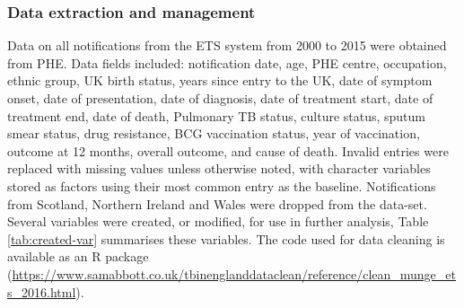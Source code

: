 \documentclass[11pt,twoside]{bristolthesis}
\begin{document}
  \hypertarget{data-extraction-and-management}{%
  \subsubsection{Data extraction and management}\label{data-extraction-and-management}}
  
  Data on all notifications from the ETS system from 2000 to 2015 were obtained from PHE. Data fields included: notification date, age, PHE centre, occupation, ethnic group, UK birth status, years since entry to the UK, date of symptom onset, date of presentation, date of diagnosis, date of treatment start, date of treatment end, date of death, Pulmonary TB status, culture status, sputum smear status, drug resistance, BCG vaccination status, year of vaccination, outcome at 12 months, overall outcome, and cause of death. Invalid entries were replaced with missing values unless otherwise noted, with character variables stored as factors using their most common entry as the baseline. Notifications from Scotland, Northern Ireland and Wales were dropped from the data-set. Several variables were created, or modified, for use in further analysis, Table \ref{tab:created-var} summarises these variables. The code used for data cleaning is available as an R package (\url{https://www.samabbott.co.uk/tbinenglanddataclean/reference/clean_munge_ets_2016.html}).
\end{document}
